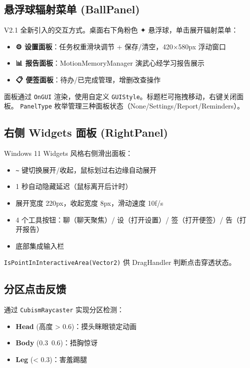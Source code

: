 \documentclass[12pt,a4paper]{ctexart}
\begin{document}
\subsection{悬浮球辐射菜单 (BallPanel)}

V2.1 全新引入的交互方式。桌面右下角粉色 ✦ 悬浮球，单击展开辐射菜单：

\begin{itemize}
    \item \textbf{⚙ 设置面板}：任务权重滑块调节 + 保存/清空，420×580px 浮动窗口
    \item \textbf{📊 报告面板}：MotionMemoryManager 演武心经学习报告展示
    \item \textbf{📋 便签面板}：待办/已完成管理，增删改查操作
\end{itemize}

面板通过 \texttt{OnGUI} 渲染，使用自定义 \texttt{GUIStyle}。标题栏可拖拽移动，右键关闭面板。
\texttt{PanelType} 枚举管理三种面板状态（None/Settings/Report/Reminders）。

\subsection{右侧 Widgets 面板 (RightPanel)}

Windows 11 Widgets 风格右侧滑出面板：

\begin{itemize}
    \item \texttt{\textasciitilde} 键切换展开/收起，鼠标划过右边缘自动展开
    \item 1 秒自动隐藏延迟（鼠标离开后计时）
    \item 展开宽度 220px，收起宽度 8px，滑动速度 10f/s
    \item 4 个工具按钮：聊（聊天聚焦）/ 设（打开设置）/ 签（打开便签）/ 告（打开报告）
    \item 底部集成输入栏
\end{itemize}

\texttt{IsPointInInteractiveArea(Vector2)} 供 DragHandler 判断点击穿透状态。

\subsection{分区点击反馈}

通过 \texttt{CubismRaycaster} 实现分区检测：

\begin{itemize}
    \item \textbf{Head} (高度 > 0.6)：摸头眯眼锁定动画
    \item \textbf{Body} (0.3~0.6)：捂胸惊讶
    \item \textbf{Leg} (< 0.3)：害羞踢腿
\end{itemize}
\end{document}
